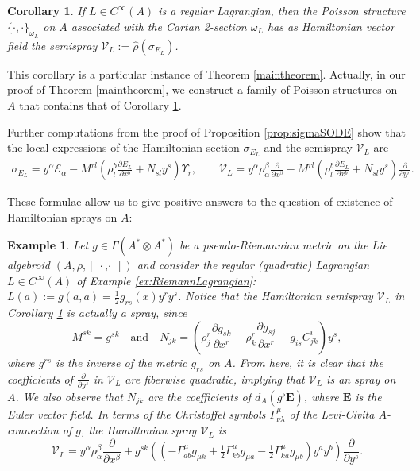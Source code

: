 \documentclass[12pt,letterpaper]{article}
\DeclareMathOperator{\dcd}{\,\cdot\,,\cdot\,}
\renewcommand{\hat}{\widehat}
\newtheorem{corollary}[theorem]{Corollary}
\newtheorem{example}[theorem]{Example}
\numberwithin{equation}{section}
\begin{document}
\begin{corollary}\label{cor1}
If $L \in C^\infty(A)$ is a regular Lagrangian,
then the Poisson structure $\{\cdot,\cdot\}_{ \omega_L }$ on $A$ associated with the Cartan 2-section $\omega_L$
has as Hamiltonian vector field the semispray $\mathcal{V}_L:=\hat{\rho}(\sigma_{E_L})$.
\end{corollary}

This corollary is a particular instance of Theorem \ref{maintheorem}. 
Actually, in our proof of Theorem  \ref{maintheorem}, we construct a family of Poisson structures on $A$
that contains that of Corollary \ref{cor1}.

Further computations from the proof of Proposition \ref{prop:sigmaSODE} 
show that the local expressions of the Hamiltonian section $\sigma_{E_L}$ and the semispray $\mathcal{V}_L$ are
\begin{align*}
\sigma_{E_L} = y^\alpha \mathcal{E}_\alpha - M^{rl}\left(\rho^b_l\frac{\partial E_L}{\partial x^b} + N_{sl}y^s \right)\Upsilon_r,
\qquad
\mathcal{V}_L = y^\alpha\rho^\beta_\alpha\frac{\partial}{\partial x^\beta} - M^{rl}\left(\rho^b_l\frac{\partial E_L}{\partial x^b} + N_{sl}y^s \right)\frac{\partial}{\partial y^r}.
\end{align*}

These formulae allow us to give positive answers to the question of existence of Hamiltonian sprays on $A$:

\begin{example}\label{ex:Spray}
  Let $g\in\Gamma(A^*\otimes A^*)$ be a pseudo-Riemannian metric on the Lie algebroid $(A,\rho,[\dcd])$
  and consider the regular (quadratic) Lagrangian $L\in C^\infty(A)$ of Example \ref{ex:RiemannLagrangian}: $L(a) := g(a,a)=\tfrac{1}{2}g_{rs}(x)y^r y^s$.
  Notice that the Hamiltonian semispray $\mathcal{V}_L$ in Corollary \ref{cor1} is actually a spray, since
  \[
    M^{sk} = g^{sk} 
    \quad\text{and}\quad
    N_{jk} = \left(\rho^r_j\frac{\partial g_{sk}}{\partial x^r}-\rho^r_k\frac{\partial g_{sj}}{\partial x^r}-g_{is}C^i_{jk}\right)y^s,
  \]
  where $g^{rs}$ is the inverse of the metric $g_{rs}$ on $A$.
  From here, it is clear that the coefficients of $\frac{\partial}{\partial y^s}$ in $\mathcal{V}_L$ are fiberwise quadratic,
  implying that $\mathcal{V}_L$ is an spray on $A$.
  We also observe that $N_{jk}$ are the coefficients of $d_A(g^{\flat}\mathbf{E})$,
  where $\mathbf{E}$ is the Euler vector field.
  In terms of the Christoffel symbols $\Gamma^{\mu}_{\nu\lambda}$ of the Levi-Civita $A$-connection of $g$, 
  the Hamiltonian spray $\mathcal{V}_L$ is
  \[
    \mathcal{V}_L = y^\alpha\rho^\beta_\alpha\frac{\partial}{\partial x^\beta} + 
    g^{sk}\left(\left( -\Gamma_{ab}^{\mu} g_{\mu k} + \tfrac{1}{2} \Gamma_{kb}^{\mu} g_{\mu a} - \tfrac{1}{2} \Gamma_{ka}^{\mu} g_{\mu b} \right) y^a y^b\right)\frac{\partial}{\partial y^s}.
  \]
\end{example}
\end{document}
